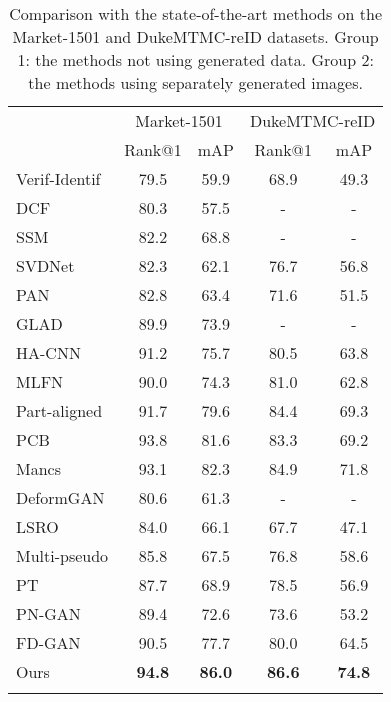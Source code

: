 \documentclass[10pt,twocolumn,letterpaper]{article}
\begin{document}
\begin{table}[tbp]
\small
\vspace{-.1in}
\caption{Comparison with the state-of-the-art methods on the Market-1501 and DukeMTMC-reID datasets. Group 1: the methods not using generated data. Group 2: the methods using separately generated images.
}
{
\label{table:mr}
\setlength{\tabcolsep}{6pt}
\begin{tabular}{l|cc|cc}
\shline
\multirow{2}{*}{Methods} & \multicolumn{2}{c|}{Market-1501} & \multicolumn{2}{c}{DukeMTMC-reID}\\
& Rank@1 & mAP & Rank@1  & mAP \\
\hline
Verif-Identif \cite{zheng2016discriminatively} & 79.5 & 59.9 & 68.9 & 49.3 \\
DCF \cite{Li2017Learning}  & 80.3 & 57.5 & - & -\\
SSM \cite{bai2017scalable}  & 82.2 & 68.8 & - & -\\
SVDNet \cite{sun2017svdnet} & 82.3 & 62.1 & 76.7 & 56.8\\
PAN \cite{zheng2018pedestrian} & 82.8 & 63.4 & 71.6 & 51.5 \\
GLAD \cite{wei2017glad} & 89.9 & 73.9 & - & - \\
HA-CNN \cite{li2018harmonious} & 91.2 & 75.7 & 80.5 & 63.8 \\
MLFN \cite{chang2018multi} & 90.0 & 74.3 & 81.0 & 62.8 \\
Part-aligned \cite{suh2018part} & 91.7 & 79.6 & 84.4 & 69.3 \\
PCB \cite{sun2017beyond} & 93.8 & 81.6 & 83.3 & 69.2\\
Mancs \cite{wang2018mancs} & 93.1 & 82.3 & 84.9 & 71.8 \\
\hline
DeformGAN \cite{siarohin2018deformable} & 80.6 & 61.3 & - & -  \\
LSRO \cite{zheng2017unlabeled} & 84.0 & 66.1 & 67.7 & 47.1  \\
Multi-pseudo \cite{huang2018multi} & 85.8 & 67.5 & 76.8 & 58.6  \\
PT \cite{liu2018pose} & 87.7 & 68.9 & 78.5 & 56.9  \\ 
PN-GAN \cite{qian2017pose} & 89.4 & 72.6 & 73.6 & 53.2 \\
FD-GAN \cite{ge2018fdgan} & 90.5 & 77.7 & 80.0 & 64.5 \\
\hline
Ours &  \textbf{94.8} & \textbf{86.0} & \textbf{86.6} & \textbf{74.8} \\
\shline
\end{tabular}}
\end{table}
\end{document}
